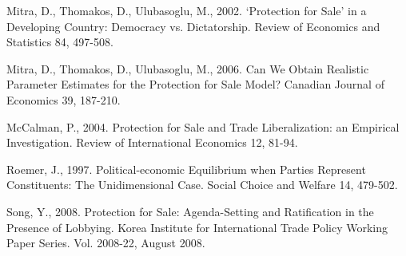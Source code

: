 \documentclass[10pt]{article}
\begin{document}
\begin{list}{}{\setlength{\leftmargin}{0.0in}\setlength{\rightmargin}{0.0in}\setlength{\itemindent}{0.0in}\setlength{\itemsep}{0.1in}}
\item Mitra, D., Thomakos, D., Ulubasoglu, M., 2002. `Protection for Sale' in a Developing Country: Democracy vs. Dictatorship. Review of Economics and Statistics 84, 497-508.

\item Mitra, D., Thomakos, D., Ulubasoglu, M., 2006. Can We Obtain Realistic Parameter Estimates for the Protection for Sale Model? Canadian Journal of Economics 39, 187-210.


\item McCalman, P., 2004. Protection for Sale and Trade Liberalization: an Empirical Investigation. Review of International Economics 12, 81-94.


\item Roemer, J., 1997. Political-economic Equilibrium when Parties Represent Constituents: The Unidimensional Case. Social Choice and Welfare 14, 479-502.

\item Song, Y., 2008. Protection for Sale: Agenda-Setting and Ratification in the Presence of Lobbying. Korea Institute for International Trade Policy Working Paper Series. Vol. 2008-22, August 2008.



\end{list}
\end{document}
